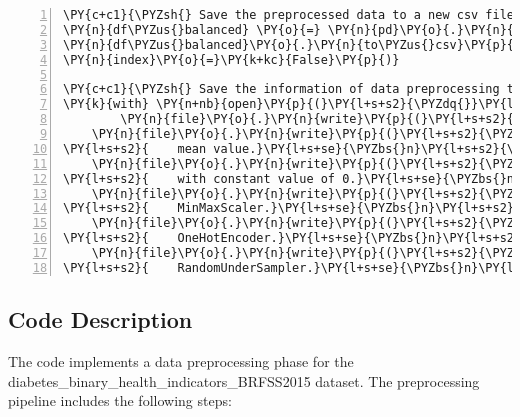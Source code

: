 \documentclass[12pt]{article}
\begin{document}
\begin{Verbatim}[commandchars=\\\{\},numbers=left,firstnumber=1,stepnumber=1,formatcom=\footnotesize]
\PY{c+c1}{\PYZsh{} Save the preprocessed data to a new csv file}
\PY{n}{df\PYZus{}balanced} \PY{o}{=} \PY{n}{pd}\PY{o}{.}\PY{n}{concat}\PY{p}{(}\PY{p}{[}\PY{n}{X\PYZus{}balanced}\PY{p}{,} \PY{n}{y\PYZus{}balanced}\PY{p}{]}\PY{p}{,} \PY{n}{axis}\PY{o}{=}\PY{l+m+mi}{1}\PY{p}{)}
\PY{n}{df\PYZus{}balanced}\PY{o}{.}\PY{n}{to\PYZus{}csv}\PY{p}{(}\PY{l+s+s2}{\PYZdq{}}\PY{l+s+s2}{diabetes\PYZus{}binary\PYZus{}health\PYZus{}indicators\PYZus{}BRFSS2015\PYZus{}preprocessed.csv}\PY{l+s+s2}{\PYZdq{}}\PY{p}{,} \PYZbs{}
\PY{n}{index}\PY{o}{=}\PY{k+kc}{False}\PY{p}{)}

\PY{c+c1}{\PYZsh{} Save the information of data preprocessing to a text file}
\PY{k}{with} \PY{n+nb}{open}\PY{p}{(}\PY{l+s+s2}{\PYZdq{}}\PY{l+s+s2}{data\PYZus{}preprocessing.txt}\PY{l+s+s2}{\PYZdq{}}\PY{p}{,} \PY{l+s+s2}{\PYZdq{}}\PY{l+s+s2}{w}\PY{l+s+s2}{\PYZdq{}}\PY{p}{)} \PY{k}{as} \PY{n}{file}\PY{p}{:}
        \PY{n}{file}\PY{o}{.}\PY{n}{write}\PY{p}{(}\PY{l+s+s2}{\PYZdq{}}\PY{l+s+s2}{Data Preprocessing Steps}\PY{l+s+se}{\PYZbs{}n}\PY{l+s+s2}{\PYZdq{}}\PY{p}{)}
    \PY{n}{file}\PY{o}{.}\PY{n}{write}\PY{p}{(}\PY{l+s+s2}{\PYZdq{}}\PY{l+s+s2}{1. Replaced missing values for numerical features with }\PY{l+s+se}{\PYZbs{}}
\PY{l+s+s2}{    mean value.}\PY{l+s+se}{\PYZbs{}n}\PY{l+s+s2}{\PYZdq{}}\PY{p}{)}
    \PY{n}{file}\PY{o}{.}\PY{n}{write}\PY{p}{(}\PY{l+s+s2}{\PYZdq{}}\PY{l+s+s2}{2. Replaced missing values for categorical features }\PY{l+s+se}{\PYZbs{}}
\PY{l+s+s2}{    with constant value of 0.}\PY{l+s+se}{\PYZbs{}n}\PY{l+s+s2}{\PYZdq{}}\PY{p}{)}
    \PY{n}{file}\PY{o}{.}\PY{n}{write}\PY{p}{(}\PY{l+s+s2}{\PYZdq{}}\PY{l+s+s2}{3. Normalized numerical features using }\PY{l+s+se}{\PYZbs{}}
\PY{l+s+s2}{    MinMaxScaler.}\PY{l+s+se}{\PYZbs{}n}\PY{l+s+s2}{\PYZdq{}}\PY{p}{)}
    \PY{n}{file}\PY{o}{.}\PY{n}{write}\PY{p}{(}\PY{l+s+s2}{\PYZdq{}}\PY{l+s+s2}{4. One\PYZhy{}hot encoded categorical features using }\PY{l+s+se}{\PYZbs{}}
\PY{l+s+s2}{    OneHotEncoder.}\PY{l+s+se}{\PYZbs{}n}\PY{l+s+s2}{\PYZdq{}}\PY{p}{)}
    \PY{n}{file}\PY{o}{.}\PY{n}{write}\PY{p}{(}\PY{l+s+s2}{\PYZdq{}}\PY{l+s+s2}{5. Balanced the data using RandomOverSampler and }\PY{l+s+se}{\PYZbs{}}
\PY{l+s+s2}{    RandomUnderSampler.}\PY{l+s+se}{\PYZbs{}n}\PY{l+s+s2}{\PYZdq{}}\PY{p}{)}
\end{Verbatim}
\subsection{Code Description}

The code implements a data preprocessing phase for the diabetes\_binary\_health\_indicators\_BRFSS2015 dataset. The preprocessing pipeline includes the following steps:
\end{document}

